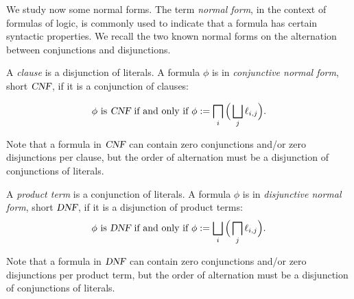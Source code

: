 We study now some normal forms. The term \emph{normal form}, in the context of formulas of logic, is commonly used to
indicate that a formula has certain syntactic properties. We recall the two known normal forms on the alternation between conjunctions and disjunctions. 
\begin{definition}
A \emph{clause} is a disjunction of literals.
  A formula $\phi$ is in \emph{conjunctive normal form}, short $\textsl{CNF}$, if it is a conjunction of clauses:
  
  $$\phi \text{ is } \textsl{CNF} \text{ if and only if}~\phi:= \bigsqcap_{i}\Big( \bigsqcup_{j} \ell_{i,j} \Big).  $$

\end{definition}

Note that a formula in $\textsl{CNF}$ can contain zero conjunctions and/or zero disjunctions per clause, but the order of alternation must be a disjunction of conjunctions of literals.

\begin{definition}\label{def:dnf}
A \emph{product term} is a conjunction of literals.
    A formula $\phi$ is in \emph{disjunctive normal form}, short $\textsl{DNF}$, if it is a disjunction of product terms:
$$\phi \text{ is } \textsl{DNF} \text{ if and only if }\phi:= \bigsqcup_{i} \Big(\bigsqcap_{j} \ell_{i,j}\Big).  $$

\end{definition}

 Note that a formula in $\textsl{DNF}$ can contain zero conjunctions and/or zero disjunctions per product term, but the order of alternation must be a disjunction of conjunctions of literals.
 

